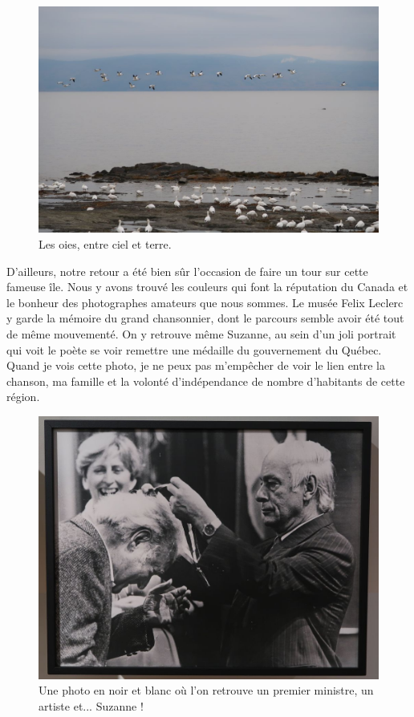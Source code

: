 \begin{figure}
\centering
\includegraphics{images/20181022_oies.JPG}
\caption{Les oies, entre ciel et terre.}
\end{figure}

D'ailleurs, notre retour a été bien sûr l'occasion de faire un tour sur
cette fameuse île. Nous y avons trouvé les couleurs qui font la
réputation du Canada et le bonheur des photographes amateurs que nous
sommes. Le musée Felix Leclerc y garde la mémoire du grand chansonnier,
dont le parcours semble avoir été tout de même mouvementé. On y retrouve
même Suzanne, au sein d'un joli portrait qui voit le poète se voir
remettre une médaille du gouvernement du Québec. Quand je vois cette
photo, je ne peux pas m'empêcher de voir le lien entre la chanson, ma
famille et la volonté d'indépendance de nombre d'habitants de cette
région.

\begin{figure}
\centering
\includegraphics{images/20181022_FelixLeclerc.JPG}
\caption{Une photo en noir et blanc où l'on retrouve un premier
ministre, un artiste et... Suzanne !}
\end{figure}

